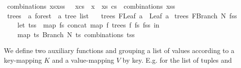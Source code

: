 \begin{isabellebody}
{\isacharbar}{\kern0pt}\ {\isachardoublequoteopen}combinations\ {\isacharparenleft}{\kern0pt}xs{\isacharhash}{\kern0pt}xss{\isacharparenright}{\kern0pt}\ {\isacharequal}{\kern0pt}\ {\isacharbrackleft}{\kern0pt}\ x{\isacharhash}{\kern0pt}cs\ {\isachardot}{\kern0pt}\ x\ {\isacharless}{\kern0pt}{\isacharminus}{\kern0pt}\ xs{\isacharcomma}{\kern0pt}\ cs\ {\isacharless}{\kern0pt}{\isacharminus}{\kern0pt}\ combinations\ xss\ {\isacharbrackright}{\kern0pt}{\isachardoublequoteclose}\isanewline
\isanewline
{}\isamarkupfalse%
\ trees\ {\isacharcolon}{\kern0pt}{\isacharcolon}{\kern0pt}\ {\isachardoublequoteopen}{\isacharprime}{\kern0pt}a\ forest\ {\isasymRightarrow}\ {\isacharprime}{\kern0pt}a\ tree\ list{\isachardoublequoteclose}\ \isanewline
\ \ {\isachardoublequoteopen}trees\ {\isacharparenleft}{\kern0pt}FLeaf\ a{\isacharparenright}{\kern0pt}\ {\isacharequal}{\kern0pt}\ {\isacharbrackleft}{\kern0pt}Leaf\ a{\isacharbrackright}{\kern0pt}{\isachardoublequoteclose}\isanewline
{\isacharbar}{\kern0pt}\ {\isachardoublequoteopen}trees\ {\isacharparenleft}{\kern0pt}FBranch\ N\ fss{\isacharparenright}{\kern0pt}\ {\isacharequal}{\kern0pt}\ {\isacharparenleft}{\kern0pt}\isanewline
\ \ \ \ let\ tss\ {\isacharequal}{\kern0pt}\ {\isacharparenleft}{\kern0pt}map\ {\isacharparenleft}{\kern0pt}{\isasymlambda}fs{\isachardot}{\kern0pt}\ concat\ {\isacharparenleft}{\kern0pt}map\ {\isacharparenleft}{\kern0pt}{\isasymlambda}f{\isachardot}{\kern0pt}\ trees\ f{\isacharparenright}{\kern0pt}\ fs{\isacharparenright}{\kern0pt}{\isacharparenright}{\kern0pt}\ fss{\isacharparenright}{\kern0pt}\ in\isanewline
\ \ \ \ map\ {\isacharparenleft}{\kern0pt}{\isasymlambda}ts{\isachardot}{\kern0pt}\ Branch\ N\ ts{\isacharparenright}{\kern0pt}\ {\isacharparenleft}{\kern0pt}combinations\ tss{\isacharparenright}{\kern0pt}{\isacharparenright}{\kern0pt}{\isachardoublequoteclose}%
\isadelimdocument
%
\endisadelimdocument
%
\isatagdocument
%
\isamarkuptrue%
%
\endisatagdocument
{\isafolddocument}%
%
\isadelimdocument
%
\endisadelimdocument
%
\begin{isamarkuptext}%
We define two auxiliary functions  and  grouping a list of values  according to a key-mapping $K$
and a value-mapping $V$ by key. E.g. for the list of tuples  and

\end{isamarkuptext}
\end{isabellebody}
